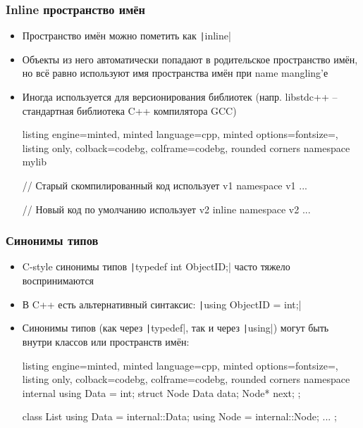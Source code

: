 \documentclass[10pt]{beamer}
\begin{document}
\begin{frame}[fragile]
\frametitle{Inline пространство имён}
\begin{itemize}
\item Пространство имён можно пометить как \texttt|inline|
\pause
\item Объекты из него автоматически попадают в родительское пространство имён, но всё равно используют имя пространства имён при name mangling'е
\pause
\item Иногда используется для версионирования библиотек (напр. libstdc++ -- стандартная библиотека C++ компилятора GCC)
\begin{tcblisting}{listing engine=minted, minted language=cpp, minted options={fontsize=\scriptsize}, listing only, colback=codebg, colframe=codebg, rounded corners}
namespace mylib {
  // Старый скомпилированный код использует v1
  namespace v1 {
    ...
  }

  // Новый код по умолчанию использует v2
  inline namespace v2 {
    ...
  }
}
\end{tcblisting}
\end{itemize}
\end{frame}

\begin{frame}[fragile]
\frametitle{Синонимы типов}
\begin{itemize}
\item C-style синонимы типов \texttt|typedef int ObjectID;| часто тяжело воспринимаются
\pause
\item В C++ есть альтернативный синтаксис: \texttt|using ObjectID = int;|
\pause
\item Синонимы типов (как через \texttt|typedef|, так и через \texttt|using|) могут быть внутри классов или пространств имён:
\begin{tcblisting}{listing engine=minted, minted language=cpp, minted options={fontsize=\scriptsize}, listing only, colback=codebg, colframe=codebg, rounded corners}
namespace internal {
  using Data = int;
  struct Node {
    Data data;
    Node* next;
  };
}

class List {
  using Data = internal::Data;
  using Node = internal::Node;
  ...
};
\end{tcblisting}
\end{itemize}
\end{frame}
\end{document}
